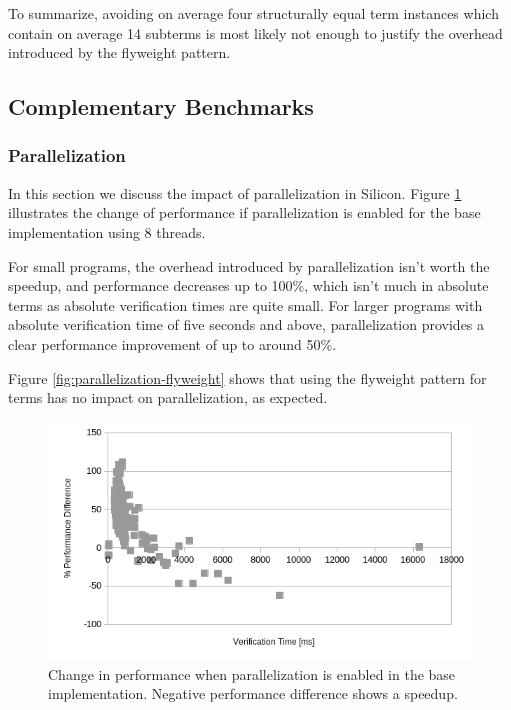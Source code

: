 \documentclass[11pt]{article}
\begin{document}
    To summarize, avoiding on average four structurally equal term instances which contain
    on average 14 subterms is most likely not enough to justify the overhead introduced by the flyweight pattern.


    \subsection{Complementary Benchmarks}

    \subsubsection{Parallelization}

    In this section we discuss the impact of
    parallelization in Silicon.
    Figure \ref{fig:parallelization} illustrates the change of performance
    if parallelization is enabled for the base implementation using 8 threads.

    For small programs, the overhead introduced by parallelization isn't worth
    the speedup, and performance decreases up to 100\%, which isn't much in absolute
    terms as absolute verification times are quite small. For larger programs
    with absolute verification time of five seconds and above, parallelization
    provides a clear performance improvement of up to around 50\%.

    Figure \ref{fig:parallelization-flyweight} shows that using the flyweight
    pattern for terms has no impact on parallelization, as expected.

    \begin{figure}[H]
        \includegraphics[width=\linewidth]{parallelization.png}
        \caption{Change in performance when parallelization is enabled in the base implementation. Negative performance difference shows a speedup.}
        \label{fig:parallelization}
    \end{figure}
\end{document}
